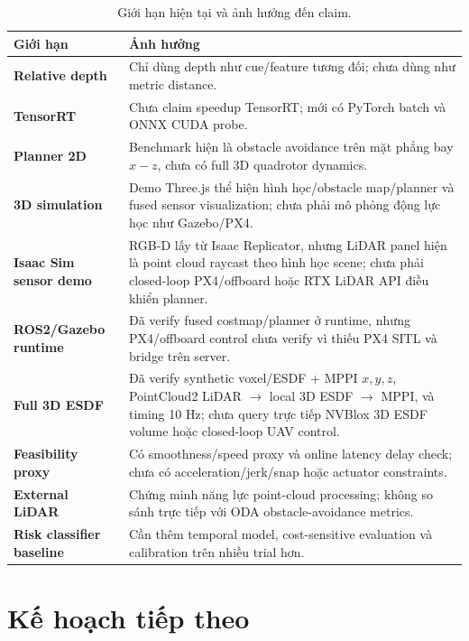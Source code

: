 \documentclass[10pt,a4paper]{article}
\begin{document}
\begin{table}[H]
\centering
\small
\caption{Giới hạn hiện tại và ảnh hưởng đến claim.}
\begin{tabularx}{0.98\linewidth}{>{\bfseries}p{3.6cm} X}
\toprule
Giới hạn & Ảnh hưởng \\
\midrule
Relative depth & Chỉ dùng depth như cue/feature tương đối; chưa dùng như metric distance. \\
TensorRT & Chưa claim speedup TensorRT; mới có PyTorch batch và ONNX CUDA probe. \\
Planner 2D & Benchmark hiện là obstacle avoidance trên mặt phẳng bay \(x-z\), chưa có full 3D quadrotor dynamics. \\
3D simulation & Demo Three.js thể hiện hình học/obstacle map/planner và fused sensor visualization; chưa phải mô phỏng động lực học như Gazebo/PX4. \\
Isaac Sim sensor demo & RGB-D lấy từ Isaac Replicator, nhưng LiDAR panel hiện là point cloud raycast theo hình học scene; chưa phải closed-loop PX4/offboard hoặc RTX LiDAR API điều khiển planner. \\
ROS2/Gazebo runtime & Đã verify fused costmap/planner ở runtime, nhưng PX4/offboard control chưa verify vì thiếu PX4 SITL và bridge trên server. \\
Full 3D ESDF & Đã verify synthetic voxel/ESDF + MPPI \(x,y,z\), PointCloud2 LiDAR \(\rightarrow\) local 3D ESDF \(\rightarrow\) MPPI, và timing 10 Hz; chưa query trực tiếp NVBlox 3D ESDF volume hoặc closed-loop UAV control. \\
Feasibility proxy & Có smoothness/speed proxy và online latency delay check; chưa có acceleration/jerk/snap hoặc actuator constraints. \\
External LiDAR & Chứng minh năng lực point-cloud processing; không so sánh trực tiếp với ODA obstacle-avoidance metrics. \\
Risk classifier baseline & Cần thêm temporal model, cost-sensitive evaluation và calibration trên nhiều trial hơn. \\
\bottomrule
\end{tabularx}
\end{table}

\section{Kế hoạch tiếp theo}
\end{document}
